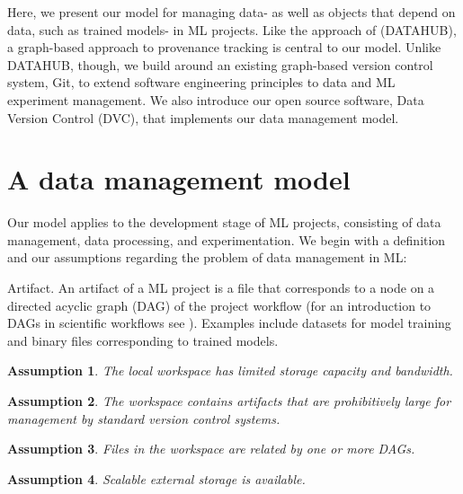 \documentclass[10pt,sigconf, authordraft]{acmart}
\newtheorem{assumption}{Assumption}
\begin{document}
Here, we present our model for managing data- as well as objects that depend on data, such as trained models- in ML projects. Like the approach of \citet{Bhardwaj2015DataHub:Scale} (DATAHUB), a graph-based approach to provenance tracking is central to our model. Unlike DATAHUB, though, we build around an existing graph-based version control system, Git, to extend software engineering principles to data and ML experiment management. We also introduce our open source software, Data Version Control (DVC), that implements our data management model. 

\section{A data management model}
Our model applies to the development stage of ML projects, consisting of data management, data processing, and experimentation. 
We begin with a definition and our assumptions regarding the problem of data management in ML:

\theoremstyle{definition}
\begin{definition}{Artifact.}
An artifact of a ML project is a file that corresponds to a node on a directed acyclic graph (DAG) of the project workflow (for an introduction to DAGs in scientific workflows see \cite{Moreau2011Thev1.1}). Examples include datasets for model training and binary files corresponding to trained models. 
\end{definition}

\begin{assumption}\label{local}
The local workspace has limited storage capacity and bandwidth.
\end{assumption}

\begin{assumption}\label{size}
The workspace contains artifacts that are prohibitively large for management by standard version control systems.
\end{assumption}

\begin{assumption}\label{dag}
Files in the workspace are related by one or more DAGs.
\end{assumption}

\begin{assumption}\label{remote_storage}
Scalable external storage is available. 
\end{assumption}
\end{document}

